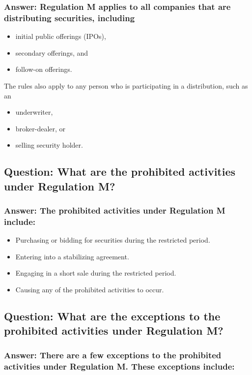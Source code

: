 \documentclass[11pt]{article}
\begin{document}
\subsubsection{Answer: Regulation M applies to all companies that are distributing securities, including}
\label{sec:orga0bade1}
\begin{itemize}
\item initial public offerings (IPOs),
\item secondary offerings, and
\item follow-on offerings.
\end{itemize}
The rules also apply to any person who is participating in a distribution, such as an
\begin{itemize}
\item underwriter,
\item broker-dealer, or
\item selling security holder.
\end{itemize}

\subsection{Question: What are the prohibited activities under Regulation M?}
\label{sec:org14740a7}

\subsubsection{Answer: The prohibited activities under Regulation M include:}
\label{sec:org16503e7}
\begin{itemize}
\item Purchasing or bidding for securities during the restricted period.
\item Entering into a stabilizing agreement.
\item Engaging in a short sale during the restricted period.
\item Causing any of the prohibited activities to occur.
\end{itemize}

\subsection{Question: What are the exceptions to the prohibited activities under Regulation M?}
\label{sec:org1b2310b}

\subsubsection{Answer: There are a few exceptions to the prohibited activities under Regulation M. These exceptions include:}
\label{sec:org0c1cff0}
\end{document}

